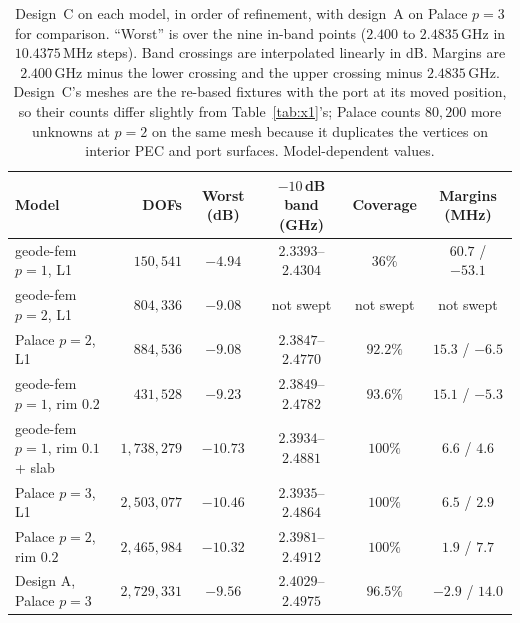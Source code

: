 \documentclass{anvil-paper}
\begin{document}
\begin{table}[t]
  \centering
  \caption{Design~C on each model, in order of refinement, with design~A on
  Palace $p = 3$ for comparison. ``Worst'' is over the nine in-band points
  ($2.400$ to $2.4835$\,GHz in $10.4375$\,MHz steps). Band crossings are
  interpolated linearly in dB. Margins are $2.400$\,GHz minus the lower
  crossing and the upper crossing minus $2.4835$\,GHz. Design~C's meshes are
  the re-based fixtures with the port at its moved position, so their counts
  differ slightly from Table~\ref{tab:x1}'s; Palace counts $80{,}200$ more
  unknowns at $p = 2$ on the same mesh because it duplicates the vertices on
  interior PEC and port surfaces. Model-dependent values.}
  \label{tab:verify}
  \small
  \setlength{\tabcolsep}{4pt}
  \begin{tabular}{@{}l r c c c c@{}}
    \toprule
    Model & DOFs & Worst (dB) & $-10$\,dB band (GHz) & Coverage & Margins (MHz) \\
    \midrule
    geode-fem $p = 1$, L1 & $150{,}541$ & $-4.94$ & $2.3393$--$2.4304$ & $36\%$ & $60.7$ / $-53.1$ \\
    geode-fem $p = 2$, L1 & $804{,}336$ & $-9.08$ & not swept & not swept & not swept \\
    Palace $p = 2$, L1 & $884{,}536$ & $-9.08$ & $2.3847$--$2.4770$ & $92.2\%$ & $15.3$ / $-6.5$ \\
    geode-fem $p = 1$, rim $0.2$ & $431{,}528$ & $-9.23$ & $2.3849$--$2.4782$ & $93.6\%$ & $15.1$ / $-5.3$ \\
    geode-fem $p = 1$, rim $0.1$ + slab & $1{,}738{,}279$ & $-10.73$ & $2.3934$--$2.4881$ & $100\%$ & $6.6$ / $4.6$ \\
    Palace $p = 3$, L1 & $2{,}503{,}077$ & $-10.46$ & $2.3935$--$2.4864$ & $100\%$ & $6.5$ / $2.9$ \\
    Palace $p = 2$, rim $0.2$ & $2{,}465{,}984$ & $-10.32$ & $2.3981$--$2.4912$ & $100\%$ & $1.9$ / $7.7$ \\
    \midrule
    Design A, Palace $p = 3$ & $2{,}729{,}331$ & $-9.56$ & $2.4029$--$2.4975$ & $96.5\%$ & $-2.9$ / $14.0$ \\
    \bottomrule
  \end{tabular}
\end{table}
\end{document}

